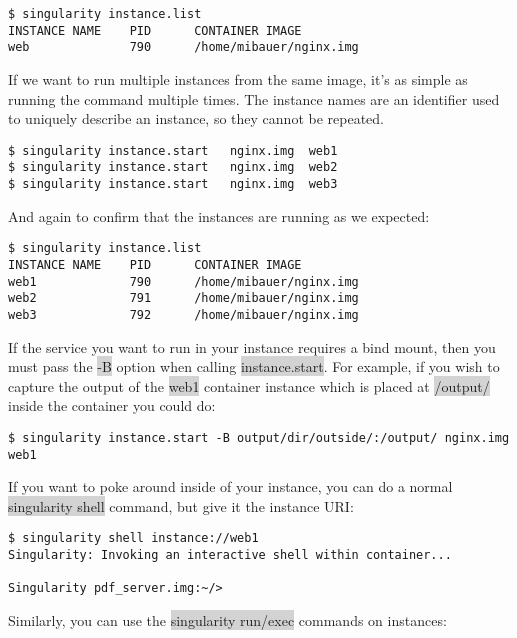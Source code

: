 \documentclass[a4paper]{article}
\begin{document}
\begin{lstlisting}[frame=single] 
$ singularity instance.list
INSTANCE NAME    PID      CONTAINER IMAGE
web              790      /home/mibauer/nginx.img
\end{lstlisting}

If we want to run multiple instances from the same image, it’s as simple as running the command multiple times. The instance names are an identifier used to uniquely describe an instance, so they cannot be repeated.

\begin{lstlisting}[frame=single] 
$ singularity instance.start   nginx.img  web1
$ singularity instance.start   nginx.img  web2
$ singularity instance.start   nginx.img  web3
\end{lstlisting}

And again to confirm that the instances are running as we expected:

\begin{lstlisting}[frame=single]  
$ singularity instance.list
INSTANCE NAME    PID      CONTAINER IMAGE
web1             790      /home/mibauer/nginx.img
web2             791      /home/mibauer/nginx.img
web3             792      /home/mibauer/nginx.img
\end{lstlisting}

If the service you want to run in your instance requires a bind mount, then you must pass the \colorbox{lightgray}{-B} option when calling \colorbox{lightgray}{instance.start}. For example, if you wish to capture the output of the \colorbox{lightgray}{web1} container instance which is placed at \colorbox{lightgray}{/output/} inside the container you could do:

\begin{lstlisting}[frame=single]  
$ singularity instance.start -B output/dir/outside/:/output/ nginx.img  web1
\end{lstlisting}

If you want to poke around inside of your instance, you can do a normal \colorbox{lightgray}{singularity shell} command, but give it the instance URI:

\begin{lstlisting}[frame=single] 
$ singularity shell instance://web1
Singularity: Invoking an interactive shell within container...

Singularity pdf_server.img:~/>  
\end{lstlisting}

Similarly, you can use the \colorbox{lightgray}{singularity run/exec} commands on instances:
\end{document}
